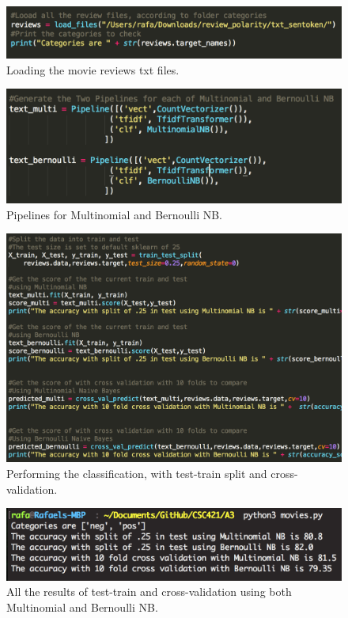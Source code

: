 \documentclass[12pt, letter]{article}
\begin{document}
 \begin{figure}[htb]
  \centering
  \includegraphics[width=0.75 \textwidth]{./figures/file_load.png}
  \caption{Loading the movie reviews txt files.}
\end{figure}

 \begin{figure}[htb]
  \centering
  \includegraphics[width=0.75 \textwidth]{./figures/pipeline.png}
  \caption{Pipelines for Multinomial and Bernoulli NB.}
\end{figure}

 \begin{figure}[htb]
  \centering
  \includegraphics[width=0.85 \textwidth]{./figures/text_tests.png}
  \caption{Performing the classification, with test-train split and cross-validation.}
\end{figure}

 \begin{figure}[htb]
  \centering
  \includegraphics[width=0.75 \textwidth]{./figures/text_result.png}
  \caption{All the results of test-train and cross-validation using both Multinomial and Bernoulli NB.}
\end{figure}
\end{document}
